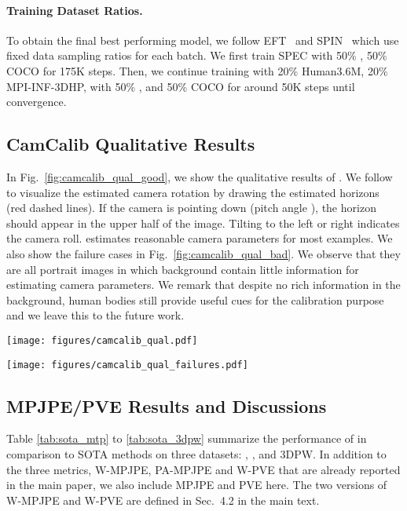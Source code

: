 \documentclass[10pt,twocolumn,letterpaper,usenames,dvipsnames]{article}
\begin{document}
\paragraph{Training Dataset Ratios.}
To obtain the final best performing model, we follow EFT~\cite{joo2020eft} and SPIN~\cite{SPIN:ICCV:2019} which use fixed data sampling ratios for each batch. We first train SPEC with 50\% \agoracam, 50\% COCO for 175K steps. Then, we continue training 
with 20\% Human3.6M, 20\% MPI-INF-3DHP, with 50\% \agoracam, and 50\% COCO for around 50K steps until convergence.

\subsection{CamCalib Qualitative Results}
In Fig.~\ref{fig:camcalib_qual_good}, we show the qualitative results of \camcalib. 
We follow \cite{zhu2020single} to visualize the estimated camera rotation by drawing the estimated horizons (red dashed lines). 
If the camera is pointing down (pitch angle ), the horizon should appear in the upper half of the image. 
Tilting to the left or right indicates the camera roll.
\camcalib estimates reasonable camera parameters for most examples.
We also show the failure cases in Fig.~\ref{fig:camcalib_qual_bad}.
We observe that they are all portrait images in which background contain little information for estimating camera parameters.
We remark that despite no rich information in the background, human bodies still provide useful cues for the calibration purpose and we leave this to the future work.
\begin{figure*}
    \centering
    \texttt{[image: figures/camcalib\_qual.pdf]}
    \caption{\textbf{\camcalib qualitative results.}}
    \label{fig:camcalib_qual_good}
\end{figure*}

\begin{figure*}
    \centering
    \texttt{[image: figures/camcalib\_qual\_failures.pdf]}
    \caption{\textbf{\camcalib failures.}}
    \label{fig:camcalib_qual_bad}
\end{figure*}

\subsection{\methodname MPJPE/PVE Results and Discussions}
Table \ref{tab:sota_mtp} to \ref{tab:sota_3dpw} summarize the performance of \methodname in comparison to SOTA methods on three datasets: \mtpcam, \agoracam, and 3DPW.
In addition to the three metrics, W-MPJPE, PA-MPJPE and W-PVE that are already reported in the main paper, we also include MPJPE and PVE here. 
The two versions of W-MPJPE and W-PVE are defined in Sec.~4.2 in the main text. 
\end{document}
